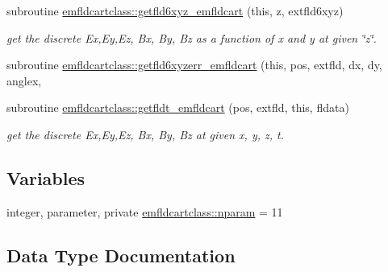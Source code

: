 \begin{DoxyCompactItemize}
\item 
subroutine \mbox{\hyperlink{namespaceemfldcartclass_a524c612ff816f308845b0171733a95a5}{emfldcartclass\+::getfld6xyz\+\_\+emfldcart}} (this, z, extfld6xyz)
\begin{DoxyCompactList}\small\item\em get the discrete Ex,Ey,Ez, Bx, By, Bz as a function of x and y at given \char`\"{}z\char`\"{}. \end{DoxyCompactList}\item 
subroutine \mbox{\hyperlink{namespaceemfldcartclass_af92b0973e83fa817606951d4155f51b9}{emfldcartclass\+::getfld6xyzerr\+\_\+emfldcart}} (this, pos, extfld, dx, dy, anglex,
\item 
subroutine \mbox{\hyperlink{namespaceemfldcartclass_a63a14e90f4526aa45d3d28a9611d3908}{emfldcartclass\+::getfldt\+\_\+emfldcart}} (pos, extfld, this, fldata)
\begin{DoxyCompactList}\small\item\em get the discrete Ex,Ey,Ez, Bx, By, Bz at given x, y, z, t. \end{DoxyCompactList}\end{DoxyCompactItemize}
\subsection*{Variables}
\begin{DoxyCompactItemize}
\item 
integer, parameter, private \mbox{\hyperlink{namespaceemfldcartclass_a72ee7da1adbf56a707b72607da000549}{emfldcartclass\+::nparam}} = 11
\end{DoxyCompactItemize}


\subsection{Data Type Documentation}
\label{structemfldcartclass_1_1emfldcart}
